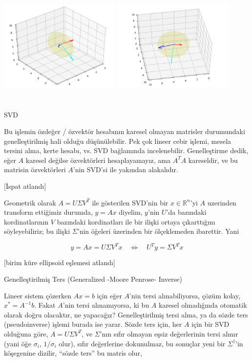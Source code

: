 \documentclass[12pt,fleqn]{article}\usepackage{../../common}
\begin{document}
\includegraphics[height=6cm,width=6cm]{vision_02_03.png}
\includegraphics[height=6cm,width=6cm]{vision_02_04.png}

SVD 

Bu işlemin özdeğer / özvektör hesabının karesel olmayan matrisler
durumundaki genelleştirilmiş hali olduğu düşünülebilir. Pek çok lineer
cebir işlemi, mesela tersini alma, kerte hesabı, vs. SVD bağlamında
incelenebilir. Genelleştirme dedik, eğer $A$ karesel değilse özvektörleri
hesaplayamayız, ama $A^TA$ kareseldir, ve bu matrisin özvektörleri $A$'nin
SVD'si ile yakından alakalıdır.

[İspat atlandı]

Geometrik olarak $A = U \Sigma V^T$ ile gösterilen SVD'nin bir $x \in
\mathbb{R}^n$'yi $A$ uzerinden transform ettiğimiz durumda, $y = Ax$
diyelim, $y$'nin $U$'da bazındaki kordinatlarının $V$ bazındaki
kordinatları ile bir ilişki ortaya çıkarttığını söyleyebiliriz; bu ilişki
$\Sigma$'nin öğeleri üzerinden bir ölçeklemeden ibarettir. Yani

$$ y = Ax = U\Sigma V^Tx 
\quad \Leftrightarrow \quad
U^Ty = \Sigma V^T x
$$

[birim küre ellipsoid eşlemesi atlandı]

Genelleştirilmiş Ters (Generalized -Moore Penrose- Inverse)

Lineer sistem çözerken $Ax = b$ için eğer $A$'nin tersi alınabiliyorsa,
çözüm kolay, $x^\ast = A^{-1}b$. Fakat $A$'nin tersi alınamıyorsa, ki bu $A$
karesel olmadığında otomatik olarak doğru olacaktır, ne yapacağız?
Genelleştirilmiş tersi alma, ya da sözde ters (pseudoinverse) işlemi burada
ise yarar. Sözde ters için, her $A$ için bir SVD olduğuna göre, $A = U
\Sigma V^T$, ve $\Sigma$'nın sıfır olmayan eşsiz değerlerinin tersi alınır (yani 
öğe $\sigma_i$, $1/\sigma_i$ olur), sıfır değerlerine dokunulmaz, bu sonuçlar yeni 
bir $\Sigma^{\dagger}$'in köşegenine dizilir, ``sözde ters'' bu matris olur,
\end{document}
